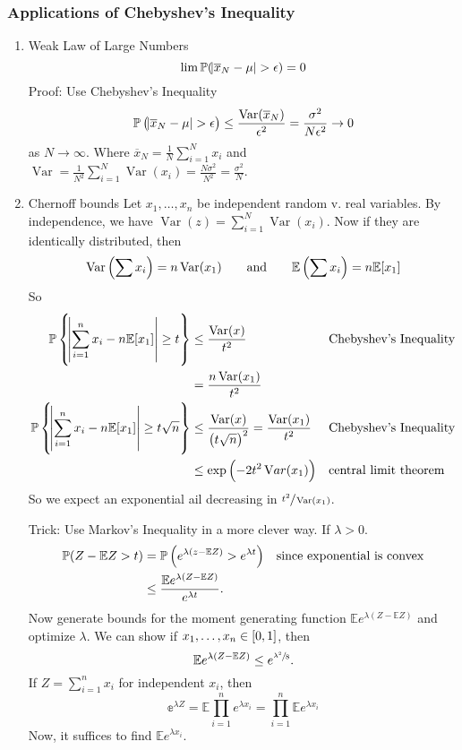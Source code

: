 \documentclass{article}
\begin{document}
\subsubsection{Applications of Chebyshev's Inequality}

\begin{enumerate}
\item Weak Law of Large Numbers
  \[\lim \mathbb P(\abs{\overline{x}_N - \mu} > \epsilon) = 0\]
  Proof: Use Chebyshev's Inequality
  \[\mathbb P \del{\abs{\overline{x}_N - \mu} > \epsilon} \leq \frac{\mathop{\mathrm{Var}}(\overline{x}_N)}{\epsilon^2} = \frac{\sigma^2}{N\epsilon^2} \to 0\]
  as \(N \to \infty\).
  Where \(\overline{x}_N = \frac{1}{N} \sum_{i=1}^Nx_i\) and \(\mathop{\mathrm{Var}} = \frac{1}{N^2}\sum_{i=1}^N \mathop{\mathrm{Var}}(x_i) = \frac{N\sigma^2}{N^2} = \frac{\sigma^2}{N}\).

\item Chernoff bounds
  Let \(x_1, \dots, x_n\) be independent random v. real variables.
  By independence, we have \(\mathop{\mathrm{Var}}(z) = \sum_{i=1}^N\mathop{\mathrm{Var}}(x_i)\).
  Now if they are identically distributed, then
  \[\mathop{\mathrm{Var}}\del{\sum x_i} = n\mathop{\mathrm{Var}}(x_1)\qquad\text{and}\qquad\mathbb{E}\del{\sum x_i} = n \mathbb E[x_1]\]
  So
  \begin{align*}
    \mathbb P\set{\abs{\sum_{i=1}^n x_i - n \mathbb E[x_1]} \geq t} &\leq \frac{\mathop{\mathrm{Var}}(x)}{t^2} && \text{Chebyshev's Inequality}\\
                                                                &= \frac{n\mathop{\mathrm{Var}}(x_1)}{t^2}\\
    \mathbb P\set{\abs{\sum_{i=1}^n x_i - n \mathbb E[x_1]} \geq t\sqrt{n}} &\leq  \frac{\mathop{\mathrm{Var}}(x)}{\del{t\sqrt{n}}^2} = \frac{\mathop{\mathrm{Var}}(x_1)}{t^2} && \text{Chebyshev's Inequality}\\
    &\leq \exp\del{-2t^2\mathop{\mathrm Var}(x_1)} && \text{central limit theorem}
  \end{align*}
  So we expect an exponential ail decreasing in \(\sfrac{t^2}{\mathop{\mathrm{Var}}(x_1)}\).

  Trick: Use Markov's Inequality in a more clever way.
  If \(\lambda > 0\).
  \begin{align*}
    \mathbb P(Z - \mathbb EZ > t) &= \mathbb{P}\del{e^{\lambda(z - \mathbb{E}Z)} > e^{\lambda t}} && \text{since exponential is convex}\\
    &\leq \frac{\mathbb E e^{\lambda(Z - \mathbb EZ)}}{e^{\lambda t}}.
  \end{align*}
  Now generate bounds for the moment generating function \(\mathbb Ee^{\lambda (Z - \mathbb EZ)}\) and optimize \(\lambda\).
  We can show if \(x_1, \dots, x_n \in \intcc{0, 1}\), then
  \[\mathbb Ee^{\lambda (Z - \mathbb EZ)} \leq e^{\sfrac{\lambda^2}{8}}.\]
  If \(Z = \sum_{i=1}^n x_i\) for independent \(x_i\), then
  \[\mathbb e^{\lambda Z} = \mathbb E \prod _{i=1}^n e^{\lambda x_i} = \prod_{i=1}^n\mathbb E e^{\lambda x_i}\]
  Now, it suffices to find \(\mathbb E e^{\lambda x_i}\).

\end{enumerate}
\end{document}
